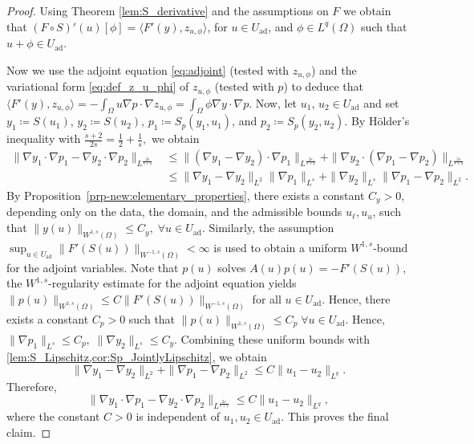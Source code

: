 \documentclass[11pt]{article}
\newcommand{\feas}{U_{\textrm{ad}}}
\theoremstyle{definition}
\theoremstyle{remark}
\begin{document}
\begin{proof}
Using Theorem \ref{lem:S_derivative} and the assumptions on  $F$ we obtain that $(F \circ S)'(u)[\phi] = \langle F'(y),z_{u,\phi}\rangle$, for $u \in \feas$, and $\phi \in L^q(\Omega)$ such that $u+\phi \in \feas$. 

Now we use
the adjoint equation \eqref{eq:adjoint} (tested with $z_{u, \phi}$) and the variational form \eqref{eq:def_z_u_phi} of
$z_{u, \phi}$ (tested with $p$) to deduce that
$ \langle F'(y), z_{u, \phi}\rangle
 = - \int_{\Omega} u \nabla p \cdot \nabla z_{u, \phi}
 = \int_{\Omega} \phi \nabla y \cdot \nabla p.$ 
Now, let $u_1$, $u_2 \in \feas$ and set
$y_1 \coloneqq S(u_1)$, $y_2 \coloneqq S(u_2)$,
$p_1 \coloneqq S_p(y_1,u_1)$, and
$p_2 \coloneqq S_p(y_2,u_2)$.
By H\"older's inequality with
$
\frac{s+2}{2s}=\frac12+\frac1s,$ 
we obtain
\begin{align*}
\|\nabla y_1 \cdot \nabla p_1 - \nabla y_2 \cdot \nabla p_2\|_{L^{\frac{2s}{s+2}}}
&\le
\|(\nabla y_1-\nabla y_2)\cdot \nabla p_1\|_{L^{\frac{2s}{s+2}}}
+
\|\nabla y_2\cdot(\nabla p_1-\nabla p_2)\|_{L^{\frac{2s}{s+2}}} \\
&\le
\|\nabla y_1-\nabla y_2\|_{L^2}
\|\nabla p_1\|_{L^s}
+
\|\nabla y_2\|_{L^s}
\|\nabla p_1-\nabla p_2\|_{L^2}.
\end{align*}
By Proposition~\ref{prp-new:elementary_properties}, there exists a constant $C_y>0$,
depending only on the data, the domain, and the admissible bounds
$u_\ell,u_u$, such that
$
\|y(u)\|_{W^{1,s}(\Omega)}
\le C_y,
\; \forall u\in\feas .
$
Similarly, the assumption
$
\sup_{u\in\feas}\|F'(S(u))\|_{W^{-1,s}(\Omega)}<\infty$
is used to obtain a uniform $W^{1,s}$-bound for the adjoint variables.
Note that $p(u)$ solves
$
A(u)p(u)=-F'(S(u)),$ 
the $W^{1,s}$-regularity estimate for the adjoint equation yields
$
\|p(u)\|_{W^{1,s}(\Omega)}
\le
C\|F'(S(u))\|_{W^{-1,s}(\Omega)}$ 
for all $u\in\feas$. Hence, there exists a constant $C_p>0$ such that
$
\|p(u)\|_{W^{1,s}(\Omega)}
\le C_p
\; \forall u\in\feas .
$
Hence, $
\|\nabla p_1\|_{L^s}\le C_p,
\; 
\|\nabla y_2\|_{L^s}\le C_y .$ Combining these uniform bounds with
\cref{lem:S_Lipschitz,cor:Sp_JointlyLipschitz}, we obtain
\[
\|\nabla y_1-\nabla y_2\|_{L^2}
+
\|\nabla p_1-\nabla p_2\|_{L^2}
\le C\|u_1-u_2\|_{L^q}.
\]
Therefore,
\[
\|\nabla y_1 \cdot \nabla p_1 - \nabla y_2 \cdot \nabla p_2\|_{L^{\frac{2s}{s+2}}}
\le C\|u_1-u_2\|_{L^q},
\]
where the constant $C>0$ is independent of $u_1,u_2\in\feas$.
This proves the final claim. 

\end{proof}
\end{document}

